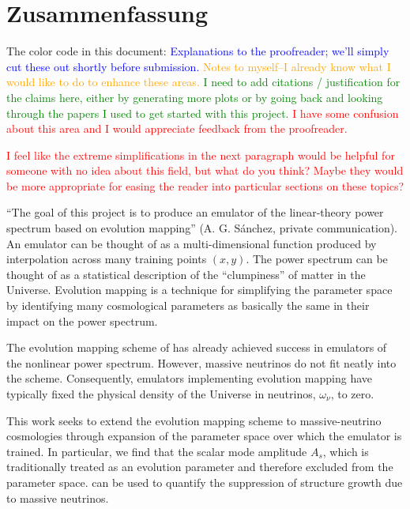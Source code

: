 

\chapter*{Zusammenfassung}

The color code in this document: \textcolor{blue}{Explanations to the
proofreader; we'll simply cut these out shortly before submission.}
\textcolor{orange}{Notes to myself--I already know what I would like to do to
enhance these areas.} \textcolor{green}{I need to add citations / 
justification for the claims here, either by generating more plots or by going
back and looking through the papers I used to get started with this project.}
\textcolor{red}{I have some confusion about this area and I would appreciate
feedback from the proofreader.}

\textcolor{red}{I feel like the extreme simplifications in the next paragraph
would be helpful for someone with no idea about this field, but what do you
think? Maybe they would be more appropriate for easing the reader into
particular sections on these topics?}

``The goal of this project is to produce an emulator of the linear-theory
power spectrum based on evolution mapping'' (A. G. S\'{a}nchez, private
communication). An emulator can be thought of as a multi-dimensional function
produced by interpolation across many training points $(x, y)$. The power
spectrum can be thought of as a statistical description of the ``clumpiness''
of matter in the Universe. Evolution mapping is a technique for simplifying
the parameter space by identifying many cosmological parameters as basically
the same in their impact on the power spectrum.

The evolution mapping scheme of  has already achieved success in
emulators of the nonlinear power spectrum. However, massive neutrinos do not
fit neatly into the scheme. Consequently, emulators implementing evolution
mapping have typically fixed the physical density of the Universe in 
neutrinos, $\omega_\nu$, to zero.

This work seeks to extend the evolution mapping scheme to massive-neutrino 
cosmologies through expansion of the parameter space over which the emulator
is trained. In particular, we find that the scalar mode amplitude $A_s$, which
is traditionally treated as an evolution parameter and therefore excluded from 
the parameter space. can be used to quantify the suppression of structure 
growth due to massive neutrinos.

